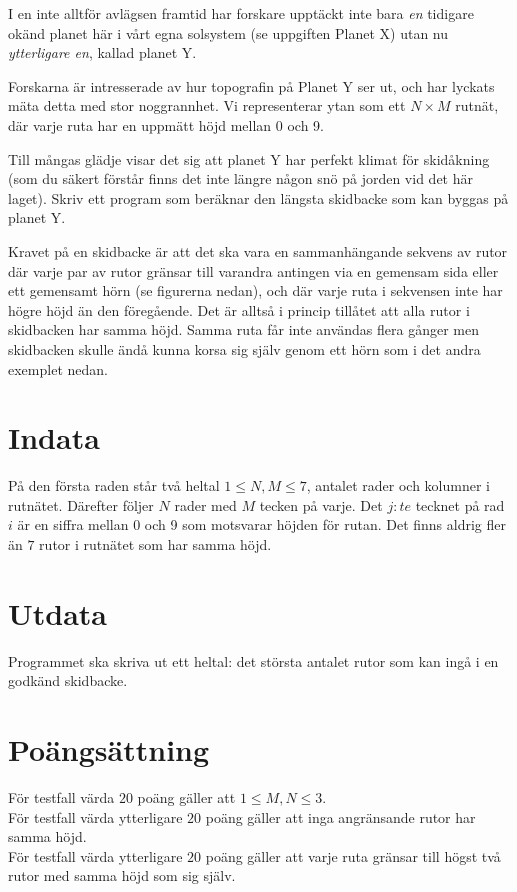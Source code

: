 
I en inte alltför avlägsen framtid har forskare upptäckt inte bara {\em en} tidigare okänd planet här i vårt egna solsystem (se uppgiften Planet X) utan nu {\em ytterligare en}, kallad planet Y.

Forskarna är intresserade av hur topografin på Planet Y ser ut, och har lyckats mäta detta med stor noggrannhet. Vi representerar ytan som ett $N \times M$ rutnät, där varje ruta har en uppmätt höjd mellan 0 och 9.

Till mångas glädje visar det sig att planet Y har perfekt klimat för skidåkning (som du säkert förstår finns det inte längre någon snö på jorden vid det här laget). Skriv ett program som beräknar den längsta skidbacke som kan byggas på planet Y.

Kravet på en skidbacke är att det ska vara en sammanhängande sekvens av rutor där varje par av rutor gränsar till varandra antingen via en gemensam sida eller ett gemensamt hörn (se figurerna nedan), och där varje ruta i sekvensen inte har högre höjd än den föregående. Det är alltså i princip tillåtet att alla rutor i skidbacken har samma höjd. Samma ruta får inte användas flera gånger men skidbacken skulle ändå kunna korsa sig själv genom ett hörn som i det andra exemplet nedan.

\section*{Indata}
På den första raden står två heltal $1 \le N,M \le 7$, 
antalet rader och kolumner i rutnätet.
Därefter följer $N$ rader med $M$ tecken på varje.
Det $j:te$ tecknet på rad $i$ är en siffra mellan
0 och 9 som motsvarar höjden för rutan. Det finns aldrig fler än $7$ rutor i rutnätet som har samma höjd.

\section*{Utdata}
Programmet ska skriva ut ett heltal: det största antalet rutor som kan ingå i en godkänd skidbacke.

\section*{Poängsättning}

För testfall värda $20$ poäng gäller att $1\leq M,N \leq 3$. \\
För testfall värda ytterligare $20$ poäng gäller att inga angränsande rutor har samma höjd. \\
För testfall värda ytterligare $20$ poäng gäller att varje ruta gränsar till högst två rutor med samma höjd som sig själv.\\


